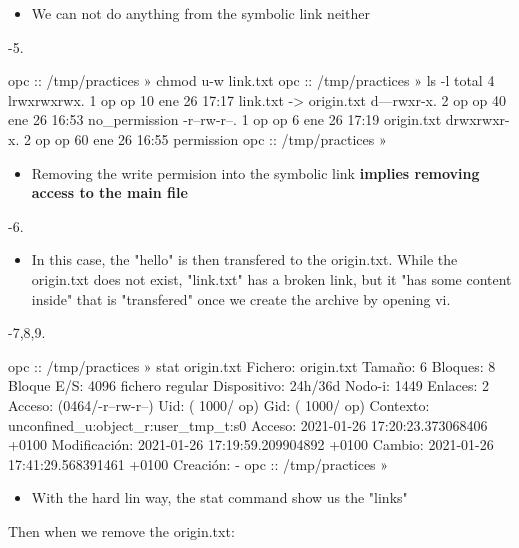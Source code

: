 \documentclass[a4paper]{article}
\begin{document}
\begin{itemize}
\item 
We can not do anything from the symbolic link neither
\end{itemize}

{-\allowbreak}5. 

\begin{plain}
opc :: /tmp/practices » chmod u-w link.txt      
opc :: /tmp/practices » ls -l             
total 4
lrwxrwxrwx. 1 op op 10 ene 26 17:17 link.txt -> origin.txt
d---rwxr-x. 2 op op 40 ene 26 16:53 no_permission
-r--rw-r--. 1 op op  6 ene 26 17:19 origin.txt
drwxrwxr-x. 2 op op 60 ene 26 16:55 permission
opc :: /tmp/practices » 
\end{plain}

\begin{itemize}
\item 
Removing the write permision into the symbolic link \textbf{implies removing access to the main file}
\end{itemize}

{-\allowbreak}6. 

\begin{itemize}
\item 
In this case, the "hello" is then transfered to the origin.txt. While the origin.txt does not exist, "link.txt" has a broken link, but it "has some content inside" that is "transfered" once we create the archive by opening vi.
\end{itemize}

{-\allowbreak}7,8,9.

\begin{plain}
opc :: /tmp/practices » stat origin.txt 
  Fichero: origin.txt
  Tamaño: 6             Bloques: 8          Bloque E/S: 4096   fichero regular
Dispositivo: 24h/36d    Nodo-i: 1449        Enlaces: 2
Acceso: (0464/-r--rw-r--)  Uid: ( 1000/      op)   Gid: ( 1000/      op)
Contexto: unconfined_u:object_r:user_tmp_t:s0
      Acceso: 2021-01-26 17:20:23.373068406 +0100
Modificación: 2021-01-26 17:19:59.209904892 +0100
      Cambio: 2021-01-26 17:41:29.568391461 +0100
    Creación: -
opc :: /tmp/practices » 
\end{plain}

\begin{itemize}
\item 
With the hard lin way, the stat command show us the "links"
\end{itemize}

Then when we remove the origin.txt:
\end{document}
